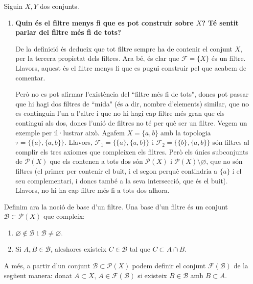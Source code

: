 \documentclass[10pt,a4paper]{article}
\renewcommand{\labelenumi}{\textbf{\thesection.\arabic{enumi}.}}
\begin{document}
Siguin $X,Y$ dos conjunts.
\begin{enumerate}
      \item \textbf{Quin és el filtre menys fi que es pot construir sobre $X$? Té sentit parlar del filtre més fi de tots?}

            De la definició és dedueix que tot filtre sempre ha de contenir el conjunt $X$, per la tercera propietat dels filtres. Ara bé,
            és clar que $\mathcal{F}=\{X\}$ és un filtre. Llavors, aquest és el filtre menys fi que es pugui construir pel que acabem de comentar.

            Però no es pot afirmar l'existència del ``filtre més fi de tots", doncs pot passar que hi hagi dos filtres de ``mida" (és a dir, nombre d'elements) similar, que no es continguin l'un a l'altre i que no hi hagi cap filtre més gran que els contingui als dos, doncs l'unió de filtres no té per què ser un filtre. Vegem un exemple per il·lustrar això. Agafem $X=\{a,b\}$ amb la topologia $\tau=\{\{a\}, \{a,b\}\}$. Llavors, $\mathcal{F}_1=\{\{a\}, \{a,b\}\}$ i $\mathcal{F}_2=\{\{b\}, \{a,b\}\}$ són filtres al complir els tres axiomes que compleixen els filtres. Però els únics subconjunts de $\mathcal{P}(X)$ que els contenen a tots dos són $\mathcal{P}(X)$ i $\mathcal{P}(X) \setminus \varnothing$, que no són filtres (el primer per contenir el buit, i el segon perquè contindria a $\{a\}$ i el seu complementari, i doncs també a la seva intersecció, que és el buit). Llavors, no hi ha cap filtre més fi a tots dos alhora.
\end{enumerate}
Definim ara la noció de base d'un filtre. Una base d'un filtre és un conjunt $\mathcal{B}\subset\mathcal{P}(X)$ que compleix:
\begin{enumerate}\renewcommand{\labelenumi}{\arabic{enumi}.}
      \item $\varnothing\notin\mathcal{B}$ i $\mathcal{B}\ne\varnothing$.
      \item Si $A,B\in\mathcal{B}$, aleshores existeix $C\in\mathcal{B}$ tal que $C\subset A\cap B$.
\end{enumerate}
A més, a partir d'un conjunt $\mathcal{B}\subset \mathcal{P}(X)$ podem definir el conjunt $\mathcal{F}(\mathcal{B})$ de la següent manera: donat $A\subset X$, $A\in\mathcal{F}(\mathcal{B})$ si existeix $B\in\mathcal{B}$ amb $B\subset A$.
\end{document}
